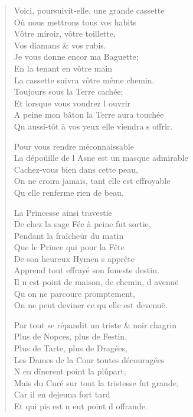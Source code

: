 \begin{verse}
Voici, poursuivit-elle, une grande cassette \\
\vin Où nous mettrons tous vos habits \\
\vin Vôtre miroir, vôtre toillette, \\
\vin Vos diamans \& vos rubis. \\
\vin Je vous donne encor ma Baguette; \\
\vin En la tenant en vôtre main \\
La cassette suivra vôtre même chemin. \\
\vin Toujours sous la Terre cachée; \\
\vin Et lorsque vous voudrez l\textquotesingle{} ouvrir \\
A peine mon bâton la Terre aura touchée \\
Qu\textquotesingle{} aussi-tôt à vos yeux elle viendra s\textquotesingle{} offrir.

\vin Pour vous rendre méconnaissable \\
La dépoüille de l\textquotesingle{} Asne est un masque admirable \\
\vin Cachez-vous bien dans cette peau, \\
On ne croira jamais, tant elle est effroyable \\
\vin Qu\textquotesingle{} elle renferme rien de beau.

\vin La Princesse ainsi travestie \\
De chez la sage Fée à peine fut sortie, \\
\vin Pendant la fraîcheür du matin \\
\vin Que le Prince qui pour la Fête \\
\vin De son heureux Hymen s\textquotesingle{} apprête \\
Apprend tout effrayé son funeste destin. \\
Il n\textquotesingle{} est point de maison, de chemin, d\textquotesingle{} avenuë \\
\vin Qu\textquotesingle{} on ne parcoure promptement, \\
On ne peut deviner ce qu\textquotesingle{} elle est devenuë.

Par tout se répandit un triste \& noir chagrin \\
\vin Plus de Nopces, plus de Festin, \\
\vin Plus de Tarte, plus de Dragées, \\
Les Dames de la Cour toutes découragées \\
\vin N\textquotesingle{} en dînerent point la plûpart; \\
Mais du Curé sur tout la tristesse fut grande, \\
\vin Car il en dejeuna fort tard \\
\vin Et qui pis est n\textquotesingle{} eut point d\textquotesingle{} offrande.


\end{verse}
